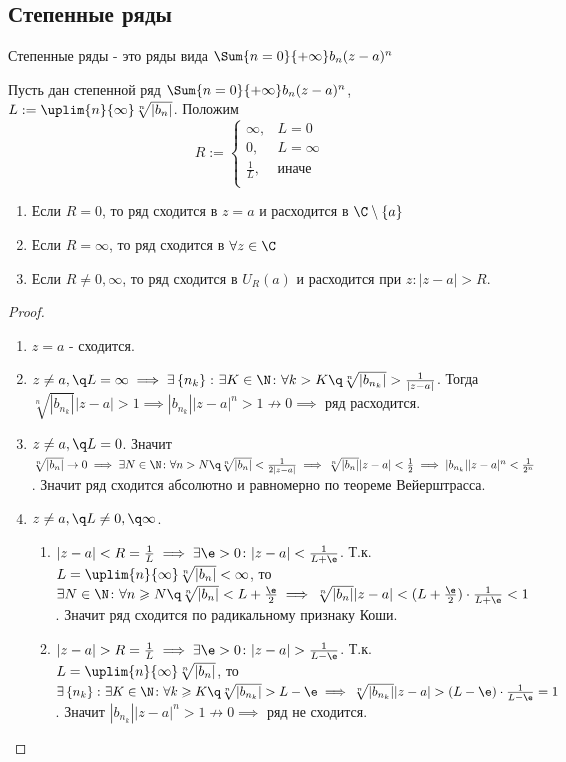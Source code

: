 \subsection{Степенные ряды}
\begin{definition}
  Степенные ряды - это ряды вида $\Sum{n=0}{+\infty}b_n(z-a)^n$
\end{definition}
\begin{theorem}
  Пусть дан степенной ряд $\Sum{n=0}{+\infty}b_n(z-a)^n$, $L:=\uplim{n}{\infty}\sqrt[n]{|b_n|}$. Положим
  \[R:= 
  \begin{cases}
    \infty, &L=0\\
    0, &L=\infty\\
    \frac{1}{L}, &\text{иначе }\\
  \end{cases}\]
  \begin{enumerate}
    \item Если $R=0$, то ряд сходится в $z=a$ и расходится в $\C\setminus \left\{a\right\}$ 
    \item Если $R=\infty$, то ряд сходится в $\forall z\in\C$ 
    \item Если $R\neq 0,\infty$, то ряд сходится в $U_R(a)$ и расходится при $z\colon |z-a|>R$. 
  \end{enumerate}
\end{theorem}
\begin{proof}
  \begin{enumerate}
    \item $z=a$ - сходится.
    \item $z\neq a,\q L=\infty\implies \exists \left\{n_k\right\}\colon \exists K\in \N\colon \forall k > K \q \sqrt[n]{|b_{n_k}|}>\frac{1}{|z-a|}$. Тогда $\sqrt[n]{|b_{n_k}|}|z-a|>1\implies |b_{n_k}||z-a|^n> 1\not\to 0\implies$ ряд расходится. 
    \item $z\neq a,\q L=0$. Значит $\sqrt[n]{|b_n|}\to 0\implies \exists N\in\N\colon \forall n>N\q \sqrt[n]{|b_n|}<\frac{1}{2|z-a|}\implies \sqrt[n]{|b_n|}|z-a|<\frac{1}{2}\implies |b_{n_k}||z-a|^n<\frac{1}{2^n}$. Значит ряд сходится абсолютно и равномерно по теореме Вейерштрасса. 
    \item $z\neq a,\q L\neq 0,\q\infty$.
    \begin{enumerate}
      \item $|z-a|<R=\frac{1}{L}\implies \exists \e>0\colon |z-a|<\frac{1}{L+\e}$. Т.к. $L=\uplim{n}{\infty}\sqrt[n]{|b_n|}<\infty$, то $\exists N\in\N\colon \forall n\geqslant N \q\sqrt[n]{|b_n|}<L+\frac{\e}{2}\implies \sqrt[n]{|b_n|}|z-a|<(L+\frac{\e}{2})\cdot \frac{1}{L+\e}<1$. Значит ряд сходится по радикальному признаку Коши.
      \item $|z-a|>R=\frac{1}{L}\implies \exists \e>0\colon |z-a|>\frac{1}{L-\e}$. Т.к. $L=\uplim{n}{\infty}\sqrt[n]{|b_n|}$, то $\exists \left\{n_k\right\}\colon\exists K\in\N\colon \forall k\geqslant K \q\sqrt[n]{|b_{n_k}|}>L-\e\implies \sqrt[n]{|b_{n_k}|}|z-a|>(L-\e)\cdot \frac{1}{L-\e}=1$. Значит 
        $|b_{n_k}||z-a|^n>1\not\to0\implies$ ряд не сходится.  
    \end{enumerate}
  \end{enumerate}
\end{proof}
